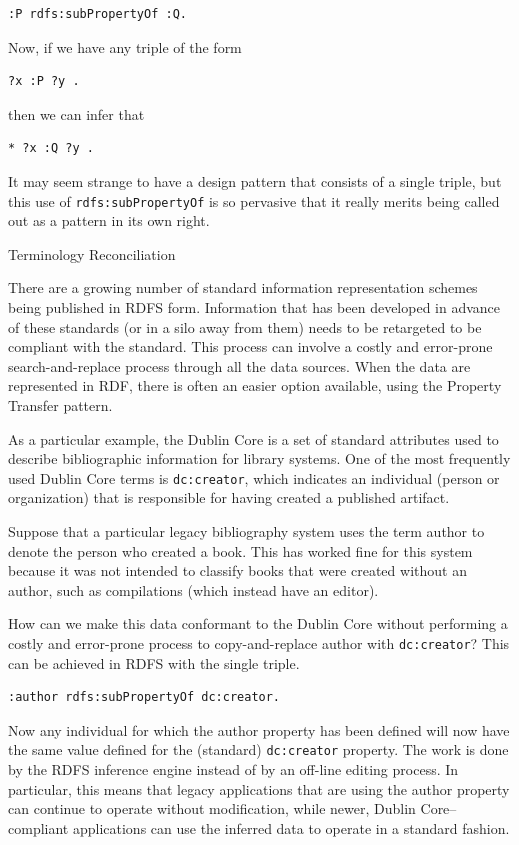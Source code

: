 \begin{lstlisting}
:P rdfs:subPropertyOf :Q.
\end{lstlisting}

Now, if we have any triple of the form

\begin{lstlisting}
?x :P ?y .
\end{lstlisting}

then we can infer that

\begin{lstlisting}
* ?x :Q ?y .
\end{lstlisting}

It may seem strange to have a design pattern that consists of a single
triple, but this use of \texttt{rdfs:subPropertyOf} is so pervasive that it
really merits being called out as a pattern in its own right.

\begin{example}{Terminology Reconciliation}

There are a growing number of standard information representation
schemes being published in RDFS form. Information that has been
developed in advance of these standards (or in a silo away from them)
needs to be retargeted to be compliant with the standard. This process
can involve a costly and error-prone search-and-replace process through
all the data sources. When the data are represented in RDF, there is
often an easier option available, using the Property Transfer pattern.

As a particular example, the Dublin Core is a set of standard attributes
used to describe bibliographic
information for library systems. One of the most frequently used Dublin
Core terms is \texttt{dc:creator}, which indicates an individual (person or
organization) that is responsible for having created a published
artifact.

Suppose that a particular legacy bibliography system uses the term
author to denote the person who
created a book. This has worked fine for this system because it was not
intended to classify books that were created without an author, such as
compilations (which instead have an editor).

How can we make this data conformant to the Dublin Core without
performing a costly and error-prone
process to copy-and-replace author with \texttt{dc:creator}? This can be achieved
in RDFS with the single triple.

\begin{lstlisting}
:author rdfs:subPropertyOf dc:creator.
\end{lstlisting}

Now any individual for which the author property has been defined will
now have the same value defined for the (standard) \texttt{dc:creator} property.
The work is done by the RDFS inference engine instead of by an off-line
editing process. In particular, this means that legacy applications that
are using the author property can continue to operate without
modification, while newer, Dublin Core--compliant applications can use
the inferred data to operate in a standard fashion.
\end{example}

